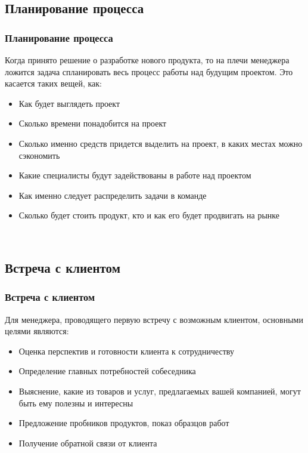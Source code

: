 \documentclass{../industrial-development}
\begin{document}
{{{{{{{{{{{{{{{\subsection{Планирование процесса}
\begin{frame} \frametitle{Планирование процесса}
Когда принято решение о разработке нового продукта, то на плечи менеджера ложится задача спланировать весь процесс работы над будущим проектом. Это касается таких вещей, как:
\begin{itemize}	
		\item Как будет выглядеть проект
		\item Сколько времени понадобится на проект
	 	\item Сколько именно средств придется выделить на проект, в каких местах можно сэкономить
	 	\item Какие специалисты будут задействованы в работе над проектом
		\item Как именно следует распределить задачи в команде
	 	\item Сколько будет стоить продукт, кто и как его будет продвигать на рынке

 \end{itemize}
\end{frame}
\lecturenotes

~\cite{How_to_be_a_good_IT-manager}

\subsection{Встреча с клиентом}
\begin{frame} \frametitle{Встреча с клиентом}
Для менеджера, проводящего первую встречу с возможным клиентом, основными целями являются:
\begin{itemize}	
		\item Оценка перспектив и готовности клиента к сотрудничеству
		\item Определение главных потребностей собеседника
	 	\item Выяснение, какие из товаров и услуг, предлагаемых вашей компанией, могут быть ему полезны и интересны
	 	\item Предложение пробников продуктов, показ образцов работ
		\item Получение обратной связи от клиента

 \end{itemize}
\end{frame}
\lecturenotes

~\cite{How_to_be_a_good_IT-manager}

}}}}}}}}}}}}}}}
\end{document}

